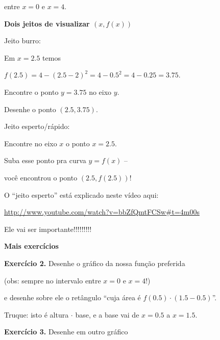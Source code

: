 \documentclass[oneside,12pt]{article}
\begin{document}
entre $x=0$ e $x=4$.


\newpage



{\bf Dois jeitos de visualizar $(x,f(x))$}

Jeito burro:

Em $x=2.5$ temos

$f(2.5) = 4 - (2.5-2)^2 = 4 - 0.5^2 = 4-0.25 = 3.75$.

Encontre o ponto $y=3.75$ no eixo $y$.

Desenhe o ponto $(2.5,3.75)$.

\msk

Jeito esperto/rápido:

Encontre no eixo $x$ o ponto $x=2.5$.

Suba esse ponto pra curva $y=f(x)$ --

você encontrou o ponto $(2.5,f(2.5))$!

\bsk

O ``jeito esperto'' está explicado neste vídeo aqui:

\ssk

{\footnotesize

\url{http://www.youtube.com/watch?v=bbZfQmtFCSw\#t=4m00s}

}

\ssk

Ele vai ser  importante!!!!!!!!!


\newpage


{\bf Mais exercícios}

{\bf Exercício 2.} Desenhe o gráfico da nossa função preferida

(obs: sempre no intervalo entre $x=0$ e $x=4$!)

e desenhe sobre ele o retângulo ``cuja área é $f(0.5)·(1.5-0.5)$''.

Truque: isto é altura $·$ base, e a base vai de $x=0.5$ a $x=1.5$.

\msk

{\bf Exercício 3.} Desenhe em outro gráfico
\end{document}
